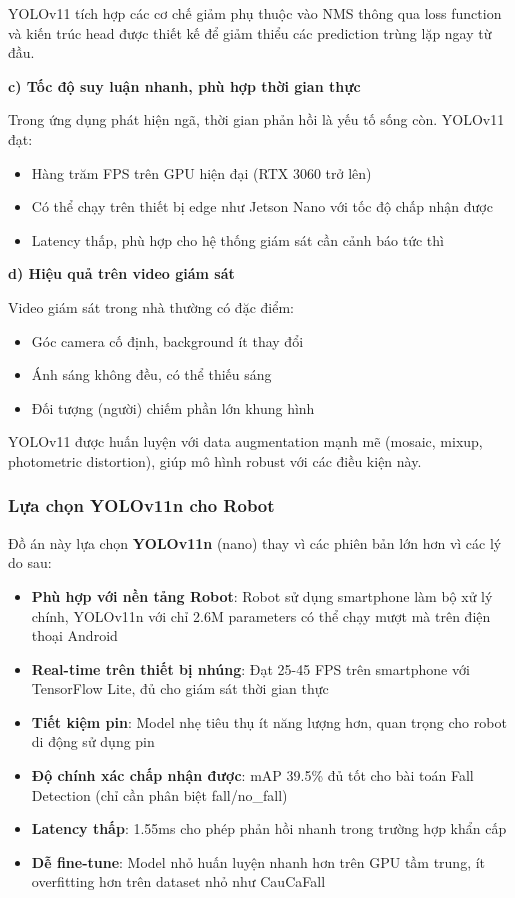 YOLOv11 tích hợp các cơ chế giảm phụ thuộc vào NMS thông qua loss function và kiến trúc head được thiết kế để giảm thiểu các prediction trùng lặp ngay từ đầu.

\textbf{c) Tốc độ suy luận nhanh, phù hợp thời gian thực}

Trong ứng dụng phát hiện ngã, thời gian phản hồi là yếu tố sống còn. YOLOv11 đạt:
\begin{itemize}
    \item Hàng trăm FPS trên GPU hiện đại (RTX 3060 trở lên)
    \item Có thể chạy trên thiết bị edge như Jetson Nano với tốc độ chấp nhận được
    \item Latency thấp, phù hợp cho hệ thống giám sát cần cảnh báo tức thì
\end{itemize}

\textbf{d) Hiệu quả trên video giám sát}

Video giám sát trong nhà thường có đặc điểm:
\begin{itemize}
    \item Góc camera cố định, background ít thay đổi
    \item Ánh sáng không đều, có thể thiếu sáng
    \item Đối tượng (người) chiếm phần lớn khung hình
\end{itemize}

YOLOv11 được huấn luyện với data augmentation mạnh mẽ (mosaic, mixup, photometric distortion), giúp mô hình robust với các điều kiện này.


\subsubsection{Lựa chọn YOLOv11n cho Robot}

Đồ án này lựa chọn \textbf{YOLOv11n} (nano) thay vì các phiên bản lớn hơn vì các lý do sau:

\begin{itemize}
    \item \textbf{Phù hợp với nền tảng Robot}: Robot sử dụng smartphone làm bộ xử lý chính, YOLOv11n với chỉ 2.6M parameters có thể chạy mượt mà trên điện thoại Android
    
    \item \textbf{Real-time trên thiết bị nhúng}: Đạt 25-45 FPS trên smartphone với TensorFlow Lite, đủ cho giám sát thời gian thực
    
    \item \textbf{Tiết kiệm pin}: Model nhẹ tiêu thụ ít năng lượng hơn, quan trọng cho robot di động sử dụng pin
    
    \item \textbf{Độ chính xác chấp nhận được}: mAP 39.5\% đủ tốt cho bài toán Fall Detection (chỉ cần phân biệt fall/no\_fall)
    
    \item \textbf{Latency thấp}: 1.55ms cho phép phản hồi nhanh trong trường hợp khẩn cấp
    
    \item \textbf{Dễ fine-tune}: Model nhỏ huấn luyện nhanh hơn trên GPU tầm trung, ít overfitting hơn trên dataset nhỏ như CauCaFall
\end{itemize}

